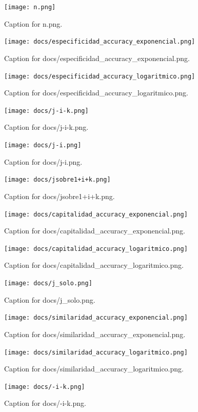 \documentclass{article}
\begin{document}
\begin{figure}[h] \centering \texttt{[image: n.png]} \caption{Caption for n.png.} \end{figure}
\begin{figure}[h] \centering \texttt{[image: docs/especificidad\_accuracy\_exponencial.png]} \caption{Caption for docs/especificidad_accuracy_exponencial.png.} \end{figure}
\begin{figure}[h] \centering \texttt{[image: docs/especificidad\_accuracy\_logaritmico.png]} \caption{Caption for docs/especificidad_accuracy_logaritmico.png.} \end{figure}
\begin{figure}[h] \centering \texttt{[image: docs/j-i-k.png]} \caption{Caption for docs/j-i-k.png.} \end{figure}
\begin{figure}[h] \centering \texttt{[image: docs/j-i.png]} \caption{Caption for docs/j-i.png.} \end{figure}
\begin{figure}[h] \centering \texttt{[image: docs/jsobre1+i+k.png]} \caption{Caption for docs/jsobre1+i+k.png.} \end{figure}
\begin{figure}[h] \centering \texttt{[image: docs/capitalidad\_accuracy\_exponencial.png]} \caption{Caption for docs/capitalidad_accuracy_exponencial.png.} \end{figure}
\begin{figure}[h] \centering \texttt{[image: docs/capitalidad\_accuracy\_logaritmico.png]} \caption{Caption for docs/capitalidad_accuracy_logaritmico.png.} \end{figure}
\begin{figure}[h] \centering \texttt{[image: docs/j\_solo.png]} \caption{Caption for docs/j_solo.png.} \end{figure}
\begin{figure}[h] \centering \texttt{[image: docs/similaridad\_accuracy\_exponencial.png]} \caption{Caption for docs/similaridad_accuracy_exponencial.png.} \end{figure}
\begin{figure}[h] \centering \texttt{[image: docs/similaridad\_accuracy\_logaritmico.png]} \caption{Caption for docs/similaridad_accuracy_logaritmico.png.} \end{figure}
\begin{figure}[h] \centering \texttt{[image: docs/-i-k.png]} \caption{Caption for docs/-i-k.png.} \end{figure}
\end{document}
